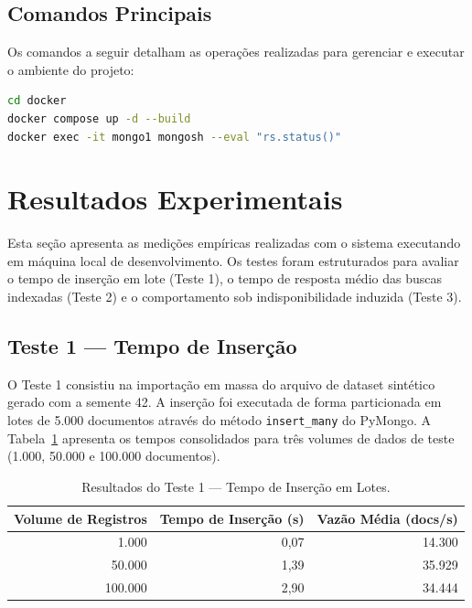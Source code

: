 \documentclass[12pt]{article}
\begin{document}
\subsection{Comandos Principais}

Os comandos a seguir detalham as operações realizadas para gerenciar e executar o ambiente do projeto:

\begin{lstlisting}[language=bash, caption=Comandos para gerenciar o ambiente Docker.]
cd docker
docker compose up -d --build
docker exec -it mongo1 mongosh --eval "rs.status()"
\end{lstlisting}

\section{Resultados Experimentais}
\label{sec:resultados}

Esta seção apresenta as medições empíricas realizadas com o sistema executando em máquina local de desenvolvimento. Os testes foram estruturados para avaliar o tempo de inserção em lote (Teste 1), o tempo de resposta médio das buscas indexadas (Teste 2) e o comportamento sob indisponibilidade induzida (Teste 3).

\subsection{Teste 1 --- Tempo de Inserção}

O Teste 1 consistiu na importação em massa do arquivo de dataset sintético gerado com a semente 42. A inserção foi executada de forma particionada em lotes de 5.000 documentos através do método \texttt{insert\_many} do PyMongo. A Tabela~\ref{tab:teste1} apresenta os tempos consolidados para três volumes de dados de teste (1.000, 50.000 e 100.000 documentos).

\begin{table}[ht]
\centering
\caption{Resultados do Teste 1 --- Tempo de Inserção em Lotes.}
\label{tab:teste1}
\small
\begin{tabular}{rrr}
\toprule
\textbf{Volume de Registros} & \textbf{Tempo de Inserção (s)} & \textbf{Vazão Média (docs/s)} \\
\midrule
1.000 & 0,07 & 14.300 \\
50.000 & 1,39 & 35.929 \\
100.000 & 2,90 & 34.444 \\
\bottomrule
\end{tabular}
\end{table}
\end{document}
